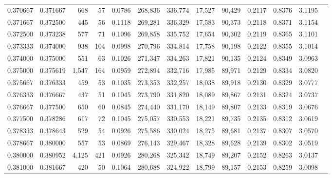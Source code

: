 \begin{tabular}{rrrrrrrrrrrrr}
0.370667 & 0.371667 &   668 &  57 &                                     0.0786 & 268,836 & 336,774 &  17,527 &  90,429 & 0.2117 & 0.8376 & 3.1195 \\
0.371667 & 0.372500 &   445 &  56 &                                     0.1118 & 269,281 & 336,329 &  17,583 &  90,373 & 0.2118 & 0.8371 & 3.1154 \\
0.372500 & 0.373238 &   577 &  71 &                                     0.1096 & 269,858 & 335,752 &  17,654 &  90,302 & 0.2119 & 0.8365 & 3.1101 \\
0.373333 & 0.374000 &   938 & 104 &                                     0.0998 & 270,796 & 334,814 &  17,758 &  90,198 & 0.2122 & 0.8355 & 3.1014 \\
0.374000 & 0.375000 &   551 &  63 &                                     0.1026 & 271,347 & 334,263 &  17,821 &  90,135 & 0.2124 & 0.8349 & 3.0963 \\
0.375000 & 0.375619 & 1,547 & 164 &                                     0.0959 & 272,894 & 332,716 &  17,985 &  89,971 & 0.2129 & 0.8334 & 3.0820 \\
0.375667 & 0.376333 &   459 &  53 &                                     0.1035 & 273,353 & 332,257 &  18,038 &  89,918 & 0.2130 & 0.8329 & 3.0777 \\
0.376333 & 0.376667 &   437 &  51 &                                     0.1045 & 273,790 & 331,820 &  18,089 &  89,867 & 0.2131 & 0.8324 & 3.0737 \\
0.376667 & 0.377500 &   650 &  60 &                                     0.0845 & 274,440 & 331,170 &  18,149 &  89,807 & 0.2133 & 0.8319 & 3.0676 \\
0.377500 & 0.378286 &   617 &  72 &                                     0.1045 & 275,057 & 330,553 &  18,221 &  89,735 & 0.2135 & 0.8312 & 3.0619 \\
0.378333 & 0.378643 &   529 &  54 &                                     0.0926 & 275,586 & 330,024 &  18,275 &  89,681 & 0.2137 & 0.8307 & 3.0570 \\
0.378667 & 0.380000 &   557 &  53 &                                     0.0869 & 276,143 & 329,467 &  18,328 &  89,628 & 0.2139 & 0.8302 & 3.0519 \\
0.380000 & 0.380952 & 4,125 & 421 &                                     0.0926 & 280,268 & 325,342 &  18,749 &  89,207 & 0.2152 & 0.8263 & 3.0137 \\
0.381000 & 0.381667 &   420 &  50 &                                     0.1064 & 280,688 & 324,922 &  18,799 &  89,157 & 0.2153 & 0.8259 & 3.0098 \\

\end{tabular}
